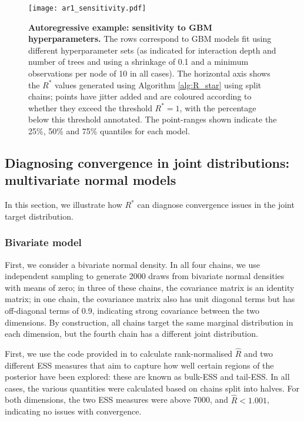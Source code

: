 \documentclass{article}
\begin{document}
\begin{figure}[!htb]
	\centerline{\texttt{[image: ar1\_sensitivity.pdf]}}
	\caption{\textbf{Autoregressive example: sensitivity to GBM hyperparameters.} The rows correspond to GBM models fit using different hyperparameter sets (as indicated for interaction depth and number of trees and using a shrinkage of 0.1 and a minimum observations per node of 10 in all cases). The horizontal axis shows the $R^*$ values generated using Algorithm \ref{alg:R_star} using split chains; points have jitter added and are coloured according to whether they exceed the threshold $R^*=1$, with the percentage below this threshold annotated. The point-ranges shown indicate the 25\%, 50\% and 75\% quantiles for each model.}
	\label{fig:ar1_sensitivity}
\end{figure}

\subsection{Diagnosing convergence in joint distributions: multivariate normal models}\label{sec:multivariate_normal}
In this section, we illustrate how $R^*$ can diagnose convergence issues in the joint target distribution.

\subsubsection{Bivariate model}\label{sec:multivariate_normal_bivariate}
First, we consider a bivariate normal density. In all four chains, we use independent sampling to generate 2000 draws from bivariate normal densities with means of zero; in three of these chains, the covariance matrix is an identity matrix; in one chain, the covariance matrix also has unit diagonal terms but has off-diagonal terms of 0.9, indicating strong covariance between the two dimensions. By construction, all chains target the same marginal distribution in each dimension, but the fourth chain has a different joint distribution.

First, we use the code provided in \cite{vehtari2019rank} to calculate rank-normalised $\widehat{R}$ and two different ESS measures that aim to capture how well certain regions of the posterior have been explored: these are known as bulk-ESS and tail-ESS. In all cases, the various quantities were calculated based on chains split into halves. For both dimensions, the two ESS measures were above 7000, and $\widehat{R}<1.001$, indicating no issues with convergence.
\end{document}
